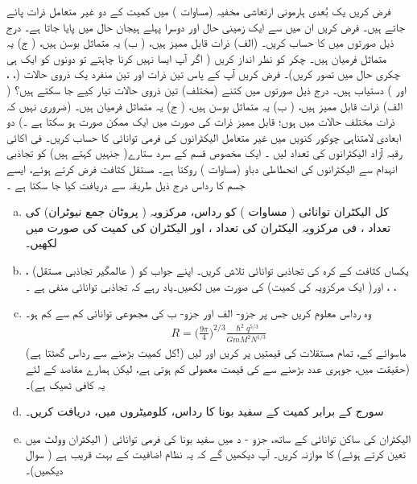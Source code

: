 فرض کریں یک بُعدی ہارمونی ارتعاشی مخفیہ (مساوات  )   میں کمیت  کے  دو غیر متعامل ذرات پائے جاتے ہیں۔ فرض کریں ان میں سے ایک زمینی حال اور دوسرا پہلے ہیجان حال میں پایا جاتا ہے۔ درج ذیل صورتوں میں  کا حساب کریں۔  (الف) ذرات قابل ممیز ہیں، ( ب) یہ متماثل بوسن ہیں،  ( ج) یہ متماثل فرمیان ہیں۔ چکر کو نظر انداز کریں ( اگر آپ ایسا نہیں کرنا چاہتے تو دونوں کو ایک ہی چکری حال میں تصور کریں)۔ 
فرض کریں آپ کے پاس تین  ذرات  اور تین منفرد یک ذروی حالات  (، ، اور )  دستیاب ہیں۔  درج ذیل صورتوں میں  کتنے   (مختلف)  تین ذروی  حالات   تیار کیے جا سکتے ہیں؟  ( الف)  ذرات قابل ممیز ہیں،  ( ب)  یہ متماثل بوسن ہیں،  ( ج)  یہ متماثل فرمیان ہیں۔  (ضروری نہیں کہ ذرات مختلف حالات میں ہوں؛ قابل  ممیز  ذرات کی صورت میں  ایک ممکن صورت ہو سکتا ہے ۔)
دو  ابعادی  لامتناہی چوکور کنویں  میں غیر متعامل الیکٹرانوں کی فرمی توانائی کا حساب کریں۔ فی اکائی  رقبہ آزاد  الیکٹرانوں کی تعداد  لیں ۔
ایک مخصوص قسم کے سرد ستارے( جنہیں   کہتے ہیں)  کو تجاذبی انہدام سے الیکٹرانوں کی انحطاطی دباو (مساوات )  روکتا ہے۔  مستقل کثافت فرض کرتے ہوئے،  ایسے جسم کا رداس  درج ذیل طریقہ سے دریافت کیا جا سکتا ہے ۔
\begin{enumerate}[a.]
\item
کل الیکٹران توانائی ( مساوات )  کو رداس،  مرکزویہ  ( پروٹان جمع نیوٹران) کی تعداد    ، فی مرکزویہ الیکٹران کی تعداد ،  اور الیکٹران کی کمیت  کی صورت میں لکھیں۔ 
\item
 یکساں  کثافت کے  کرہ   کی تجاذبی توانائی تلاش کریں۔ اپنے جواب کو ( عالمگیر تجاذبی مستقل)  ، ، ، اور( ایک مرکزویہ کی کمیت)   کی صورت میں لکھیں۔یاد رہے  کہ تجاذبی توانائی منفی ہے ۔
\item
وہ رداس معلوم کریں جس پر جزو-  الف اور جزو- ب کی مجموعی توانائی کم سے کم ہو۔ 
\begin{align*}
R = \big ( \frac{9 \pi}{4} \big )^{2/3} \frac{\hslash^2 q^{5/3}}{GmM^2 N^{1/3}}
\end{align*}
(کل کمیت بڑھنے سے رداس گھٹتا ہے!)  ماسوائے  کے،  تمام مستقلات کی قیمتیں پر کریں اور  لیں (حقیقت میں،  جوہری عدد بڑھنے سے    کی قیمت معمولی کم ہوتی ہے،  لیکن ہمارے مقاصد کے لئے یہ کافی ٹھیک ہے)۔  
 \item 
 سورج کے برابر کمیت کے سفید بونا کا رداس، کلومیٹروں میں،  دریافت کریں۔ 
\item
الیکٹران کی ساکن توانائی کے ساتھ،  جزو - د  میں سفید بونا کی فرمی توانائی (  الیکٹران وولٹ میں تعین کرتے ہوئے) کا   موازنہ کریں۔ آپ دیکھیں گے کہ یہ نظام اضافیت کے بہت قریب ہے ( سوال    دیکھیں)۔
\end{enumerate}
